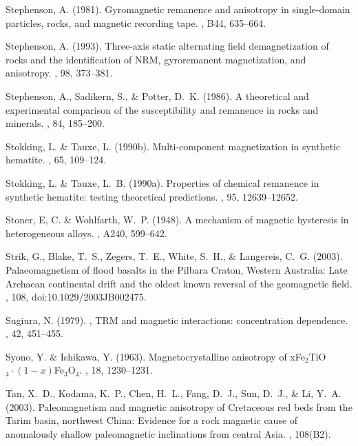 Stephenson, A. (1981).
\newblock Gyromagnetic remanence and anisotropy in single-domain particles,
  rocks, and magnetic recording tape.
, B44, 635--664.

Stephenson, A. (1993).
\newblock Three-axis static alternating field demagnetization of rocks and the
  identification of NRM, gyroremanent magnetization, and anisotropy.
, 98, 373--381.

Stephenson, A., Sadikern, S., \& Potter, D.~K. (1986).
\newblock A theoretical and experimental comparison of the susceptibility and
  remanence in rocks and minerals.
, 84, 185--200.

Stokking, L. \& Tauxe, L. (1990b).
\newblock Multi-component magnetization in synthetic hematite.
, 65, 109--124.

Stokking, L. \& Tauxe, L.~B. (1990a).
\newblock Properties of chemical remanence in synthetic hematite: testing
  theoretical predictions.
, 95, 12639--12652.

Stoner, E, C. \& Wohlfarth, W.~P. (1948).
\newblock A mechanism of magnetic hysteresis in heterogeneous alloys.
, A240, 599--642.

Strik, G., Blake, T.~S., Zegers, T.~E., White, S.~H., \& Langereis, C.~G.
  (2003).
\newblock Palaeomagnetism of flood basalts in the Pilbara Craton, Western
  Australia: Late Archaean continental drift and the oldest known reversal of
  the geomagnetic field.
, 108, doi:10.1029/2003JB002475.

Sugiura, N. (1979).
, {TRM} and magnetic interactions: concentration dependence.
, 42, 451--455.

Syono, Y. \& Ishikawa, Y. (1963).
\newblock Magnetocrystalline anisotropy of xFe$_2$TiO$_4\cdot(1-x)$Fe$_3$O$_4$.
, 18, 1230--1231.

Tan, X.~D., Kodama, K.~P., Chen, H.~L., Fang, D.~J., Sun, D.~J., \& Li, Y.~A.
  (2003).
\newblock Paleomagnetism and magnetic anisotropy of Cretaceous red beds from
  the Tarim basin, northwest China: Evidence for a rock magnetic cause of
  anomalously shallow paleomagnetic inclinations from central Asia.
, 108(B2).


